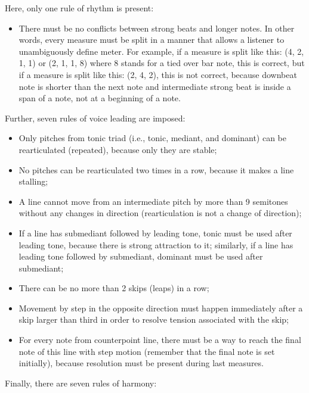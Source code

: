 \documentclass{article}
\begin{document}
Here, only one rule of rhythm is present:
\begin{itemize}
	\item There must be no conflicts between strong beats and longer notes. In other words, every measure must be split in a manner that allows a listener to unambiguously define meter. For example, if a measure is split like this: (4, 2, 1, 1) or (2, 1, 1, 8) where 8 stands for a tied over bar note, this is correct, but if a measure is split like this: (2, 4, 2), this is not correct, because downbeat note is shorter than the next note and intermediate strong beat is inside a span of a note, not at a beginning of a note.
\end{itemize}
Further, seven rules of voice leading are imposed:
\begin{itemize}
	\item Only pitches from tonic triad (i.e., tonic, mediant, and dominant) can be rearticulated (repeated), because only they are stable;
	\item No pitches can be rearticulated two times in a row, because it makes a line stalling;
	\item A line cannot move from an intermediate pitch by more than 9 semitones without any changes in direction (rearticulation is not a change of direction);
	\item If a line has submediant followed by leading tone, tonic must be used after leading tone, because there is strong attraction to it; similarly, if a line has leading tone followed by submediant, dominant must be used after submediant;
	\item There can be no more than 2 skips (leaps) in a row;
	\item Movement by step in the opposite direction must happen immediately after a skip larger than third in order to resolve tension associated with the skip;
	\item For every note from counterpoint line, there must be a way to reach the final note of this line with step motion (remember that the final note is set initially), because resolution must be present during last measures.
\end{itemize}
Finally, there are seven rules of harmony:
\end{document}
